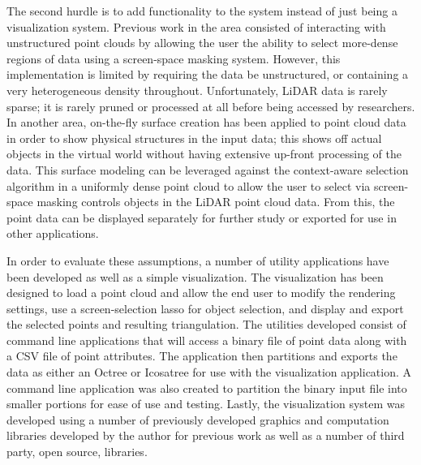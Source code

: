 The second hurdle is to add functionality to the system instead of just being a
visualization system. Previous work in the area consisted of interacting with
unstructured point clouds \cite{2_yu:hal-01178051} by allowing the user the
ability to select more-dense regions of data using a screen-space masking
system. However, this implementation is limited by requiring the data be
unstructured, or containing a very heterogeneous density throughout.
Unfortunately, LiDAR data is rarely sparse; it is rarely pruned or processed at
all before being accessed by researchers. In another area, on-the-fly surface
creation has been applied to point cloud data in order to show physical
structures \cite{1_VAST:VAST11:105-112} in the input data; this shows off actual
objects in the virtual world without having extensive up-front processing of the
data. This surface modeling can be leveraged against the context-aware selection
algorithm in a uniformly dense point cloud to allow the user to select via
screen-space masking controls objects in the LiDAR point cloud data. From this,
the point data can be displayed separately for further study or exported for use
in other applications.

In order to evaluate these assumptions, a number of utility applications have
been developed as well as a simple visualization. The visualization has been
designed to load a point cloud and allow the end user to modify the rendering
settings, use a screen-selection lasso for object selection, and display and
export the selected points and resulting triangulation. The utilities developed
consist of command line applications that will access a binary file of point
data along with a CSV file of point attributes. The application then partitions
and exports the data as either an Octree or Icosatree for use with the
visualization application. A command line application was also created to
partition the binary input file into smaller portions for ease of use and
testing. Lastly, the visualization system was developed using a number of
previously developed graphics and computation libraries developed by the author
for previous work as well as a number of third party, open source, libraries.
